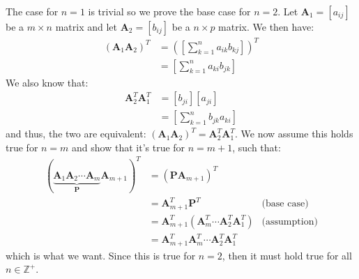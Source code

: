 \begin{sol}
The case for $n=1$ is trivial so we prove the base case for $n=2$. Let $\bm{A}_1=[a_{ij}]$ be a $m\times n$ matrix and let $\bm{A}_2=[b_{ij}]$ be a $n\times p$ matrix. We then have:
\begin{align}
    \left(\bm{A}_1\bm{A}_2\right)^T &= \left(\left[\sum_{k=1}^n a_{ik}b_{kj}\right]\right)^T \\ 
    &= \left[\sum_{k=1}^n a_{ki}b_{jk}\right]
\end{align}
We also know that:
\begin{align}
    \bm{A}_2^T\bm{A}_1^T &= [b_{ji}][a_{ji}] \\ 
     &= \left[\sum_{k=1}^n b_{jk}a_{ki} \right]
\end{align}
and thus, the two are equivalent: $\left(\bm{A}_1\bm{A}_2\right)^T = \bm{A}_2^T\bm{A}_1^T$. We now assume this holds true for $n=m$ and show that it's true for $n=m+1$, such that:
\begin{align}
    \left(\underbrace{\bm{A}_1\bm{A}_2\cdots \bm{A}_m}_{\bm{P}}\bm{A}_{m+1}\right)^T &= (\bm{P}\bm{A}_{m+1})^T \\ 
    &= \bm{A}_{m+1}^T\bm{P}^T & \text{(base case)} \\
    &= \bm{A}_{m+1}^T\left(\bm{A}_m^T\cdots\bm{A}_2^T\bm{A}_1^T\right) & \text{(assumption)} \\ 
    &= \bm{A}_{m+1}^T\bm{A}_m^T\cdots\bm{A}_2^T\bm{A}_1^T
\end{align}
which is what we want. Since this is true for $n=2$, then it must hold true for all $n \in \mathbb{Z}^+$.
\end{sol}